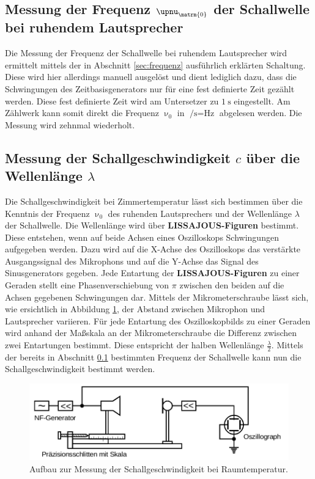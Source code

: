 \subsection{Messung der Frequenz $\upnu_{\matrm{0}}$ der Schallwelle bei ruhendem Lautsprecher}
\label{sec:schall} %
Die Messung der Frequenz der Schallwelle bei ruhendem Lautsprecher wird ermittelt mittels der in Abschnitt \ref{sec:frequenz} ausführlich erklärten Schaltung.
Diese wird hier allerdings manuell ausgelöst und dient lediglich dazu, dass die Schwingungen des Zeitbasisgenerators nur für eine fest definierte Zeit gezählt werden.
Diese fest definierte Zeit wird am Untersetzer zu $\SI{1}{\second}$ eingestellt. Am Zählwerk kann somit direkt die Frequenz $\upnu_{\mathrm{0}}$ in $\si{\per\second}=\si{\Hz}$ abgelesen werden.
Die Messung wird zehnmal wiederholt.
\subsection{Messung der Schallgeschwindigkeit $c$ über die Wellenlänge $\lambda$}
Die Schallgeschwindigkeit bei Zimmertemperatur lässt sich bestimmen über die Kenntnis der Frequenz $\upnu_{\mathrm{0}}$ des ruhenden Lautsprechers und der Wellenlänge $\lambda$ der Schallwelle.
Die Wellenlänge wird über \textbf{LISSAJOUS-Figuren} bestimmt.
Diese entstehen, wenn auf beide Achsen eines Oszilloskops Schwingungen aufgegeben werden. Dazu wird auf die X-Achse des Oszilloskops das verstärkte Ausgangssignal des Mikrophons und auf die Y-Achse das Signal des Sinusgenerators gegeben.
Jede Entartung der \textbf{LISSAJOUS-Figuren} zu einer Geraden stellt eine Phasenverschiebung von $\pi$ zwischen den beiden auf die Achsen gegebenen Schwingungen dar.
Mittels der Mikrometerschraube lässt sich, wie ersichtlich in Abbildung \ref{fig:lisa}, der Abstand zwischen Mikrophon und Lautsprecher variieren.
Für jede Entartung des Oszilloskopbilds zu einer Geraden wird anhand
der Maßskala an der Mikrometerschraube die Differenz zwischen zwei Entartungen bestimmt. Diese entspricht der halben Wellenlänge $\frac{\lambda}{2}$.
Mittels der bereits in Abschnitt \ref{sec:schall} bestimmten Frequenz der Schallwelle kann nun die Schallgeschwindigkeit bestimmt werden.

\begin{figure}
	\includegraphics{Bilder/lissajou.png}
	\caption{Aufbau zur Messung der Schallgeschwindigkeit bei Raumtemperatur. \cite{Anleitung}}
	\label{fig:lisa}
\end{figure}


